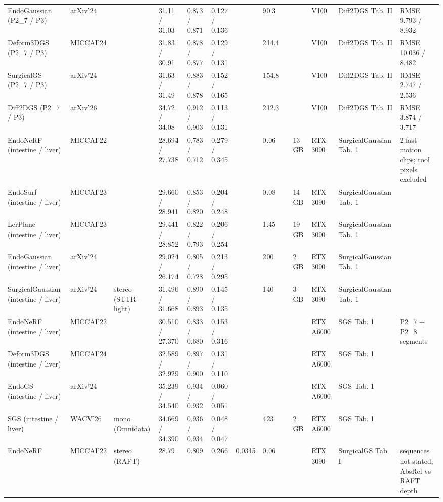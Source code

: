 \documentclass[9pt]{extarticle}
\begin{document}
\begin{longtable}{@{}p{4.2cm}p{1.15cm}p{2.1cm}p{2.2cm}p{2.0cm}p{2.0cm}p{1.35cm}p{0.85cm}p{1.15cm}p{1.0cm}p{1.35cm}p{2.3cm}p{3.6cm}@{}}
EndoGaussian (P2\_7 / P3) & arXiv'24 &  & 31.11 / 31.03 & 0.873 / 0.871 & 0.127 / 0.136 &  & 90.3 &  &  & V100 & Diff2DGS Tab. II & RMSE 9.793 / 8.932 \\
Deform3DGS (P2\_7 / P3) & MICCAI'24 &  & 31.83 / 30.91 & 0.878 / 0.877 & 0.129 / 0.131 &  & 214.4 &  &  & V100 & Diff2DGS Tab. II & RMSE 10.036 / 8.482 \\
SurgicalGS (P2\_7 / P3) & arXiv'24 &  & 31.63 / 31.49 & 0.883 / 0.878 & 0.152 / 0.165 &  & 154.8 &  &  & V100 & Diff2DGS Tab. II & RMSE 2.747 / 2.536 \\
Diff2DGS (P2\_7 / P3) & arXiv'26 &  & 34.72 / 34.08 & 0.912 / 0.903 & 0.113 / 0.131 &  & 212.3 &  &  & V100 & Diff2DGS Tab. II & RMSE 3.874 / 3.717 \\
EndoNeRF (intestine / liver) & MICCAI'22 &  & 28.694 / 27.738 & 0.783 / 0.712 & 0.279 / 0.345 &  & 0.06 &  & 13 GB & RTX 3090 & SurgicalGaussian Tab. 1 & 2 fast-motion clips; tool pixels excluded \\
EndoSurf (intestine / liver) & MICCAI'23 &  & 29.660 / 28.941 & 0.853 / 0.820 & 0.204 / 0.248 &  & 0.08 &  & 14 GB & RTX 3090 & SurgicalGaussian Tab. 1 &  \\
LerPlane (intestine / liver) & MICCAI'23 &  & 29.441 / 28.852 & 0.822 / 0.793 & 0.206 / 0.254 &  & 1.45 &  & 19 GB & RTX 3090 & SurgicalGaussian Tab. 1 &  \\
EndoGaussian (intestine / liver) & arXiv'24 &  & 29.024 / 26.174 & 0.805 / 0.728 & 0.213 / 0.295 &  & 200 &  & 2 GB & RTX 3090 & SurgicalGaussian Tab. 1 &  \\
SurgicalGaussian (intestine / liver) & arXiv'24 & stereo (STTR-light) & 31.496 / 31.668 & 0.890 / 0.893 & 0.145 / 0.135 &  & 140 &  & 3 GB & RTX 3090 & SurgicalGaussian Tab. 1 &  \\
EndoNeRF (intestine / liver) & MICCAI'22 &  & 30.510 / 27.370 & 0.833 / 0.680 & 0.153 / 0.316 &  &  &  &  & RTX A6000 & SGS Tab. 1 & P2\_7 + P2\_8 segments \\
Deform3DGS (intestine / liver) & MICCAI'24 &  & 32.589 / 32.929 & 0.897 / 0.900 & 0.131 / 0.110 &  &  &  &  & RTX A6000 & SGS Tab. 1 &  \\
EndoGS (intestine / liver) & arXiv'24 &  & 35.239 / 34.540 & 0.934 / 0.932 & 0.060 / 0.051 &  &  &  &  & RTX A6000 & SGS Tab. 1 &  \\
SGS (intestine / liver) & WACV'26 & mono (Omnidata) & 34.669 / 34.390 & 0.936 / 0.934 & 0.048 / 0.047 &  & 423 &  & 2 GB & RTX A6000 & SGS Tab. 1 &  \\
EndoNeRF & MICCAI'22 & stereo (RAFT) & 28.79 & 0.809 & 0.266 & 0.0315 & 0.06 &  &  & RTX 3090 & SurgicalGS Tab. I & sequences not stated; AbsRel vs RAFT depth \\

\end{longtable}
\end{document}
